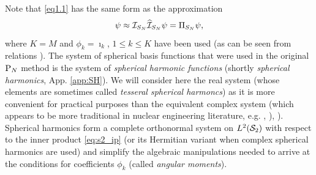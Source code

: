 Note that \eqref{eq1.1} has the same form as the approximation 
$$
	\psi \approx \PiSN\PihSN\psi = \Projop[S_N]{\psi},
$$
where $K = M$ and $\phi_k = \imath_k$, $1 \leq k \leq K$ have been used (as can be seen from relations
). The system of spherical basis functions that were used in the original $\PN$
method is the system of \textit{spherical harmonic functions} (shortly \textit{spherical harmonics}, App. \ref{app:SH}).
We will consider here the real system (whose elements are sometimes called \textit{tesseral spherical harmoncs}) as it is more convenient
for practical purposes than the equivalent complex system (which appears to be more traditional in nuclear engineering 
literature, e.g. \cite[Sec. 9.7]{Stacey1}, \cite[Sec. 14.4]{Reuss1}), \cite[Chap. V]{Stammler}). Spherical harmonics
form a complete orthonormal system on $\Lp[2](\Sphere)$ with respect to the inner product \eqref{eq:s2_ip} (or its Hermitian 
variant when complex spherical harmonics are used) and simplify the algebraic manipulations needed to arrive at the 
conditions for coefficients $\phi_k$ (called \textit{angular moments}). 

